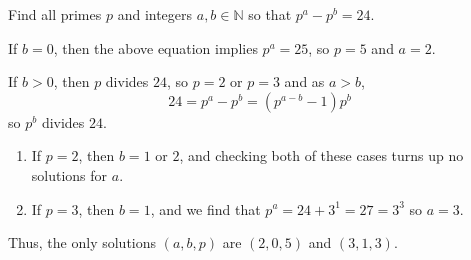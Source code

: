 \documentclass[11pt,dvipsnames]{book}
\def\N{{\mathbb{N}}}
\numberwithin{equation}{section} %
\numberwithin{figure}{section} %
\numberwithin{table}{section} %
\begin{document}
\begin{exercise} Find all primes $p$ and integers $a,b\in\N$ so that $p^{a}-p^{b}=24$.


\begin{solution}
 If $b=0$, then the above equation implies $p^{a}=25$, so $p=5$ and $a=2$. 
 
 If $b> 0$, then $p$ divides $24$, so $p=2$ or $p=3$ and as $a>b$,
 \[
 24 = p^{a}-p^{b} = (p^{a-b}-1)p^{b}
 \]
 so $p^{b}$ divides $24$.
 \begin{enumerate}[label=(\alph*)]
 \item If $p=2$, then $b=1$ or $2$, and checking both of these cases turns up no solutions for $a$.
 \item If $p=3$, then $b=1$, and we find that $p^{a} = 24+3^{1}=27=3^3$ so $a=3$. 
 \end{enumerate}
 
 Thus, the only solutions $(a,b,p)$ are $(2,0,5)$ and $(3,1,3)$.
 
 \end{solution}

 
 
 
 



\end{exercise}

%
%
%
%

%
%
%
%
\end{document}
